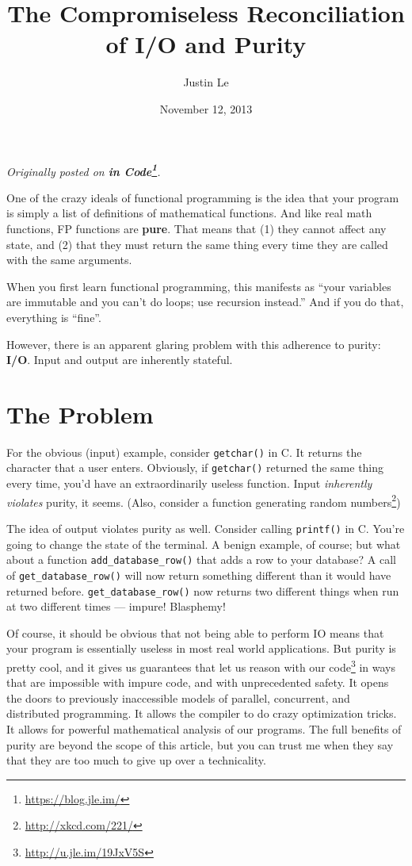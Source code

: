 \documentclass[]{article}
\title{The Compromiseless Reconciliation of I/O and Purity}
\author{Justin Le}
\date{November 12, 2013}
\renewcommand{\href}[2]{#2\footnote{\url{#1}}}
\begin{document}
\maketitle

\emph{Originally posted on \textbf{\href{https://blog.jle.im/}{in
Code}}.}

One of the crazy ideals of functional programming is the idea that your
program is simply a list of definitions of mathematical functions. And
like real math functions, FP functions are \textbf{pure}. That means
that (1) they cannot affect any state, and (2) that they must return the
same thing every time they are called with the same arguments.

When you first learn functional programming, this manifests as ``your
variables are immutable and you can't do loops; use recursion instead.''
And if you do that, everything is ``fine''.

However, there is an apparent glaring problem with this adherence to
purity: \textbf{I/O}. Input and output are inherently stateful.

\section{The Problem}\label{the-problem}

For the obvious (input) example, consider \texttt{getchar()} in C. It
returns the character that a user enters. Obviously, if
\texttt{getchar()} returned the same thing every time, you'd have an
extraordinarily useless function. Input \emph{inherently violates}
purity, it seems. (Also, consider a \href{http://xkcd.com/221/}{function
generating random numbers})

The idea of output violates purity as well. Consider calling
\texttt{printf()} in C. You're going to change the state of the
terminal. A benign example, of course; but what about a function
\texttt{add\_database\_row()} that adds a row to your database? A call
of \texttt{get\_database\_row()} will now return something different
than it would have returned before. \texttt{get\_database\_row()} now
returns two different things when run at two different times --- impure!
Blasphemy!

Of course, it should be obvious that not being able to perform IO means
that your program is essentially useless in most real world
applications. But purity is pretty cool, and it gives us guarantees that
let us \href{http://u.jle.im/19JxV5S}{reason with our code} in ways that
are impossible with impure code, and with unprecedented safety. It opens
the doors to previously inaccessible models of parallel, concurrent, and
distributed programming. It allows the compiler to do crazy optimization
tricks. It allows for powerful mathematical analysis of our programs.
The full benefits of purity are beyond the scope of this article, but
you can trust me when they say that they are too much to give up over a
technicality.
\end{document}
